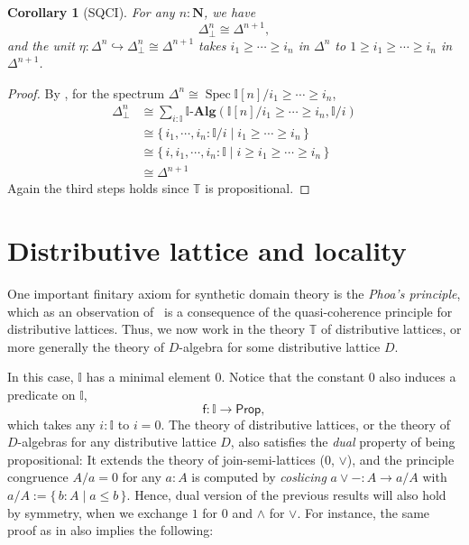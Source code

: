 \documentclass[12pt]{amsart}
\newtheorem{corollary}[theorem]{Corollary}
\theoremstyle{definition}
\newcommand{\mb}[1]{\mathbf{#1}}
\newcommand{\mbb}[1]{\mathbb{#1}}
\newcommand{\T}{\mbb T}
\newcommand{\I}{\mbb I}
\newcommand{\ms}[1]{\mathsf{#1}}
\newcommand{\alg}{\text{-}\mb{Alg}}
\newcommand{\scomp}[2]{\{\,#1\mid#2\,\}}
\newcommand{\hook}{\hookrightarrow}
\newcommand{\N}{\mb N}
\newcommand{\prt}{_{\bot}}
\newcommand{\pp}{\ms{Prop}}
\newcommand{\spec}{\operatorname{Spec}}
\begin{document}


\begin{corollary}[SQCI]
  For any $n : \N$, we have
  \[ \Delta^n\prt \cong \Delta^{n+1}, \]
  and the unit $\eta : \Delta^n \hook \Delta^n\prt \cong \Delta^{n+1}$ takes $i_1 \ge \cdots \ge i_n$ in $\Delta^n$ to $1 \ge i_1 \ge \cdots \ge i_n$ in $\Delta^{n+1}$. 
\end{corollary}
\begin{proof}
  By , for the spectrum $\Delta^n \cong \spec\I[n]/i_1 \ge \cdots \ge i_n$,
  \begin{align*}
    \Delta^n\prt 
    &\cong \sum_{i:\I}\I\alg(\I[n]/i_1\ge\cdots\ge i_n,\I/i) \\
    &\cong \scomp{i_1,\cdots,i_n:\I/i}{i_1 \ge \cdots \ge i_n} \\
    &\cong \scomp{i,i_1,\cdots,i_n:\I}{i \ge i_1 \ge \cdots \ge i_n} \\
    &\cong \Delta^{n+1}
  \end{align*}
  Again the third steps holds since $\T$ is propositional.
\end{proof}

\section{Distributive lattice and locality}\label{sec:locality}

One important finitary axiom for synthetic domain theory is the \emph{Phoa's principle}, which as an observation of~\cite{gratzer2024directed} is a consequence of the quasi-coherence principle for distributive lattices. Thus, we now work in the theory $\T$ of distributive lattices, or more generally the theory of $D$-algebra for some distributive lattice $D$.

In this case, $\I$ has a minimal element $0$. Notice that the constant $0$ also induces a predicate on $\I$,
\[ \ms f : \I \to \pp, \]
which takes any $i : \I$ to $i = 0$. The theory of distributive lattices, or the theory of $D$-algebras for any distributive lattice $D$, also satisfies the \emph{dual} property of being propositional: It extends the theory of join-semi-lattices ($0$, $\vee$), and the principle congruence $A/a = 0$ for any $a:A$ is computed by \emph{coslicing} $a \vee - : A \to a/A$ with $a/A := \scomp{b:A}{a \le b}$. Hence, dual version of the previous results will also hold by symmetry, when we exchange $1$ for $0$ and $\wedge$ for $\vee$. For instance, the same proof as in  also implies the following:
\end{document}
